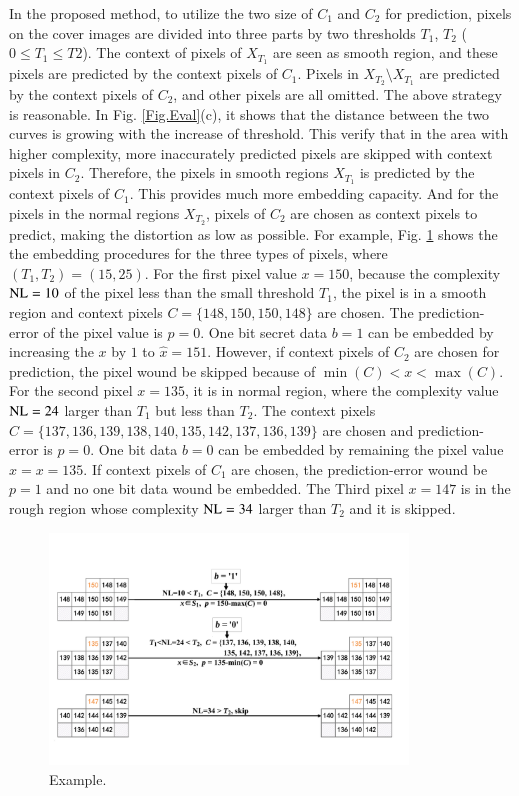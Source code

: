\documentclass[review,3p,10pt,sort&compress]{elsarticle}
\begin{document}
In the proposed method, to utilize the two size of $C_1$ and $C_2$ for prediction, pixels on the cover images are divided into three parts by two thresholds $T_1$, $T_2$ ($0 \leq T_1 \leq T2$). The context of pixels of $X_{T_1}$ are seen as smooth region, and these pixels are predicted by the context pixels of $C_1$. Pixels in $X_{T_2} \setminus X_{T_1}$ are predicted by the context pixels of $C_2$, and other pixels are all omitted. The above strategy is reasonable. In Fig. \ref{Fig.Eval}(c), it shows that the distance between the two curves is growing with the increase of threshold. This verify that in the area with higher complexity, more inaccurately predicted pixels are skipped with context pixels in $C_2$. Therefore, the pixels in smooth regions $X_{T_1}$ is predicted by the context pixels of $C_1$. This provides much more embedding capacity. And for the pixels in the normal regions $X_{T_2}$, pixels of $C_2$ are chosen as context pixels to predict, making the distortion as low as possible. For example, Fig. \ref{Fig.EmbedExample} shows the the embedding procedures for the three types of pixels, where $(T_1, T_2) = (15, 25)$. For the first pixel value $x = 150$, because the complexity ${\rm NL} = 10$ of the pixel less than the small threshold $T_1$, the pixel is in a smooth region and context pixels $C = \{148, 150, 150, 148\}$ are chosen. The prediction-error of the pixel value is $p = 0$. One bit secret data $b = 1$ can be embedded by increasing the $x$ by $1$ to $\hat{x} = 151$. However, if context pixels of $C_2$ are chosen for prediction, the pixel wound be skipped because of $\min(C) < x < \max(C)$. For the second pixel $x = 135$, it is in normal region, where the complexity value ${\rm NL} = 24$ larger than $T_1$ but less than $T_2$. The context pixels $C = \{137, 136, 139, 138, 140, 135, 142, 137, 136, 139\}$ are chosen and prediction-error is $p = 0$. One bit data $b = 0$ can be embedded by remaining the pixel value $\hat{x} = x = 135$. If context pixels of $C_1$ are chosen, the prediction-error wound be $p = 1$ and no one bit data wound be embedded. The Third pixel $x = 147$ is in the rough region whose complexity ${\rm NL} = 34$ larger than $T_2$ and it is skipped.
\begin{figure}
\centering
\includegraphics[width=0.85\textwidth]{figures/EmbedwithTh.pdf}
\centering
\caption{Example.}
\label{Fig.EmbedExample}
\end{figure}
\end{document}
